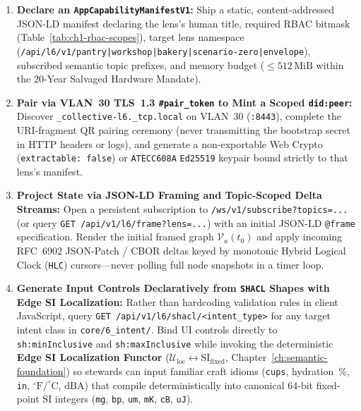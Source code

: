 \begin{enumerate}
    \item \textbf{Declare an \texttt{AppCapabilityManifestV1}:} Ship a static, content-addressed
          JSON-LD manifest declaring the lens's human title, required RBAC bitmask
          (Table~\ref{tab:ch1-rbac-scopes}), target lens namespace
          (\texttt{/api/l6/v1/pantry|workshop|bakery|scenario-zero|envelope}), subscribed semantic
          topic prefixes, and memory budget ($\le 512\,\mathrm{MiB}$ within the 20-Year Salvaged
          Hardware Mandate).
    \item \textbf{Pair via VLAN~30 TLS~1.3 \texttt{\#pair\_token} to Mint a Scoped \texttt{did:peer}:}
          Discover \texttt{\_collective-l6.\_tcp.local} on VLAN~30 (\texttt{:8443}), complete
          the URI-fragment QR pairing ceremony (never transmitting the bootstrap secret in HTTP
          headers or logs), and generate a non-exportable Web Crypto (\texttt{extractable: false})
          or \texttt{ATECC608A} \texttt{Ed25519} keypair bound strictly to that lens's manifest.
    \item \textbf{Project State via JSON-LD Framing and Topic-Scoped Delta Streams:}
          Open a persistent subscription to \texttt{/ws/v1/subscribe?topics=...} (or query
          \texttt{GET /api/v1/l6/frame?lens=...}) with an initial JSON-LD \texttt{@frame}
          specification. Render the initial framed graph $\mathcal{V}_a(t_0)$ and apply incoming
          RFC~6902 JSON-Patch / CBOR deltas keyed by monotonic Hybrid Logical Clock (\texttt{HLC})
          cursors---never polling full node snapshots in a timer loop.
    \item \textbf{Generate Input Controls Declaratively from \texttt{SHACL} Shapes with Edge SI Localization:}
          Rather than hardcoding validation rules in client JavaScript, query
          \texttt{GET /api/v1/l6/shacl/<intent\_type>} for any target intent class in
          \texttt{core/6\_intent/}. Bind UI controls directly to \texttt{sh:minInclusive} and
          \texttt{sh:maxInclusive} while invoking the deterministic \textbf{Edge SI Localization
          Functor} ($\mathcal{U}_{\mathrm{loc}} \leftrightarrow \mathrm{SI}_{\mathrm{fixed}}$,
          Chapter~\ref{ch:semantic-foundation}) so stewards can input familiar craft idioms
          (\texttt{cups}, hydration~$\%$, \texttt{in}, $^\circ\mathrm{F}/^\circ\mathrm{C}$,
          $\mathrm{dBA}$) that compile deterministically into canonical 64-bit fixed-point SI
          integers (\texttt{mg}, \texttt{bp}, \texttt{um}, \texttt{mK}, \texttt{cB}, \texttt{uJ}).

\end{enumerate}
